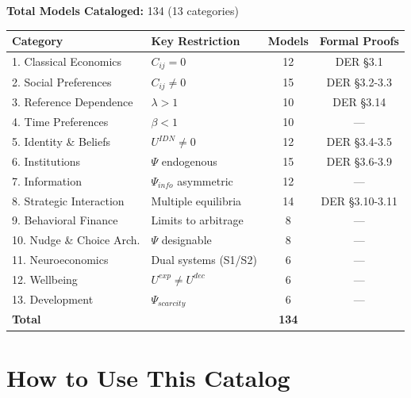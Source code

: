 \begin{tcolorbox}[colback=blue!5!white, colframe=blue!75!black,
    title=\textbf{Theory Space Overview}]

\textbf{Total Models Cataloged:} 134 (13 categories)

\begin{center}
\begin{tabular}{@{}llcc@{}}
\toprule
\textbf{Category} & \textbf{Key Restriction} & \textbf{Models} & \textbf{Formal Proofs} \\
\midrule
1. Classical Economics & $C_{ij} = 0$ & 12 & DER §3.1 \\
2. Social Preferences & $C_{ij} \neq 0$ & 15 & DER §3.2-3.3 \\
3. Reference Dependence & $\lambda > 1$ & 10 & DER §3.14 \\
4. Time Preferences & $\beta < 1$ & 10 & --- \\
5. Identity \& Beliefs & $U^{IDN} \neq 0$ & 12 & DER §3.4-3.5 \\
6. Institutions & $\Psi$ endogenous & 15 & DER §3.6-3.9 \\
7. Information & $\Psi_{info}$ asymmetric & 12 & --- \\
8. Strategic Interaction & Multiple equilibria & 14 & DER §3.10-3.11 \\
9. Behavioral Finance & Limits to arbitrage & 8 & --- \\
10. Nudge \& Choice Arch. & $\Psi$ designable & 8 & --- \\
11. Neuroeconomics & Dual systems (S1/S2) & 6 & --- \\
12. Wellbeing & $U^{exp} \neq U^{dec}$ & 6 & --- \\
13. Development & $\Psi_{scarcity}$ & 6 & --- \\
\midrule
\textbf{Total} & & \textbf{134} & \\
\bottomrule
\end{tabular}
\end{center}

\end{tcolorbox}

\section{How to Use This Catalog}
\label{sec:ms-usage}

